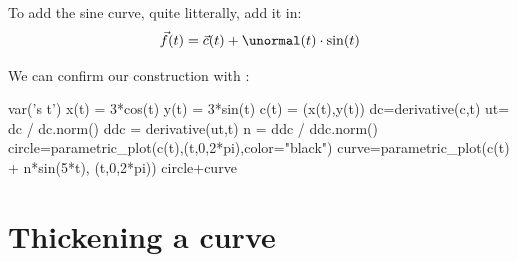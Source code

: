 \documentclass{ximera}
\begin{document}
\begin{example}
\begin{explanation}
\begin{image}
\end{image}
To add the sine curve, quite litterally, add it in:
\[
\vec{f}(t) = \vec{c}(t) + \unormal(t)\cdot \sin(t)
\]
\begin{onlineOnly}
We can confirm our construction with : 
\begin{sageCell}
var('s t')
x(t) = 3*cos(t)
y(t) = 3*sin(t)
c(t) = (x(t),y(t))
dc=derivative(c,t)
ut= dc / dc.norm()
ddc = derivative(ut,t)
n = ddc / ddc.norm()
circle=parametric_plot(c(t),(t,0,2*pi),color="black")
curve=parametric_plot(c(t) + n*sin(5*t), (t,0,2*pi))
circle+curve
\end{sageCell}
\end{onlineOnly}
  \end{explanation}
\end{example}

\section{Thickening a curve}
\end{document}
